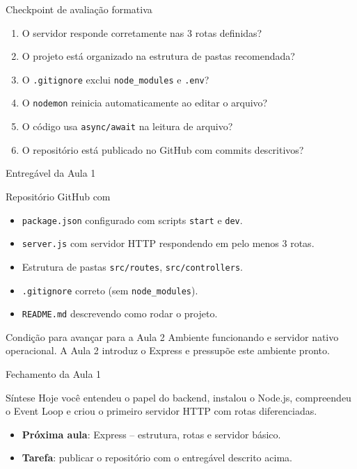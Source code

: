 \documentclass[aspectratio=169]{beamer}
\newcommand{\code}[1]{\texttt{#1}}
\begin{document}
\begin{frame}{Checkpoint de avalia\c{c}\~ao formativa}
\begin{enumerate}
  \item O servidor responde corretamente nas 3 rotas definidas?
  \item O projeto est\'a organizado na estrutura de pastas recomendada?
  \item O \code{.gitignore} exclui \code{node\_modules} e \code{.env}?
  \item O \code{nodemon} reinicia automaticamente ao editar o arquivo?
  \item O c\'odigo usa \code{async/await} na leitura de arquivo?
  \item O reposit\'orio est\'a publicado no GitHub com commits descritivos?
\end{enumerate}
\end{frame}

\begin{frame}{Entreg\'avel da Aula 1}
\begin{block}{Reposit\'orio GitHub com}
\begin{itemize}
  \item \code{package.json} configurado com scripts \code{start} e \code{dev}.
  \item \code{server.js} com servidor HTTP respondendo em pelo menos 3 rotas.
  \item Estrutura de pastas \code{src/routes}, \code{src/controllers}.
  \item \code{.gitignore} correto (sem \code{node\_modules}).
  \item \code{README.md} descrevendo como rodar o projeto.
\end{itemize}
\end{block}
\begin{alertblock}{Condi\c{c}\~ao para avan\c{c}ar para a Aula 2}
Ambiente funcionando e servidor nativo operacional. A Aula 2 introduz o Express e pressup\~oe este ambiente pronto.
\end{alertblock}
\end{frame}

\begin{frame}{Fechamento da Aula 1}
\begin{block}{S\'intese}
Hoje voc\^e entendeu o papel do backend, instalou o Node.js, compreendeu o Event Loop e criou o primeiro servidor HTTP com rotas diferenciadas.
\end{block}
\begin{itemize}
  \item \textbf{Pr\'oxima aula}: Express -- estrutura, rotas e servidor b\'asico.
  \item \textbf{Tarefa}: publicar o reposit\'orio com o entreg\'avel descrito acima.
\end{itemize}
\end{frame}
\end{document}
